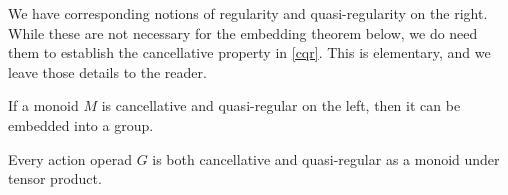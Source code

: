 \documentclass{amsbook} %
\numberwithin{section}{chapter}
\begin{document}
\begin{rem}
We have corresponding notions of regularity and quasi-regularity on the right. While these are not necessary for the embedding theorem below, we do need them to establish the cancellative property in \cref{cqr}. This is elementary, and we leave those details to the reader.
\end{rem}

\begin{thm} If a monoid $M$ is cancellative and quasi-regular on the left, then it can be embedded into a group.
\end{thm}

\begin{prop} \label{cqr} Every action operad $G$ is both cancellative and quasi-regular as a monoid under tensor product.
\end{prop}
\end{document}
